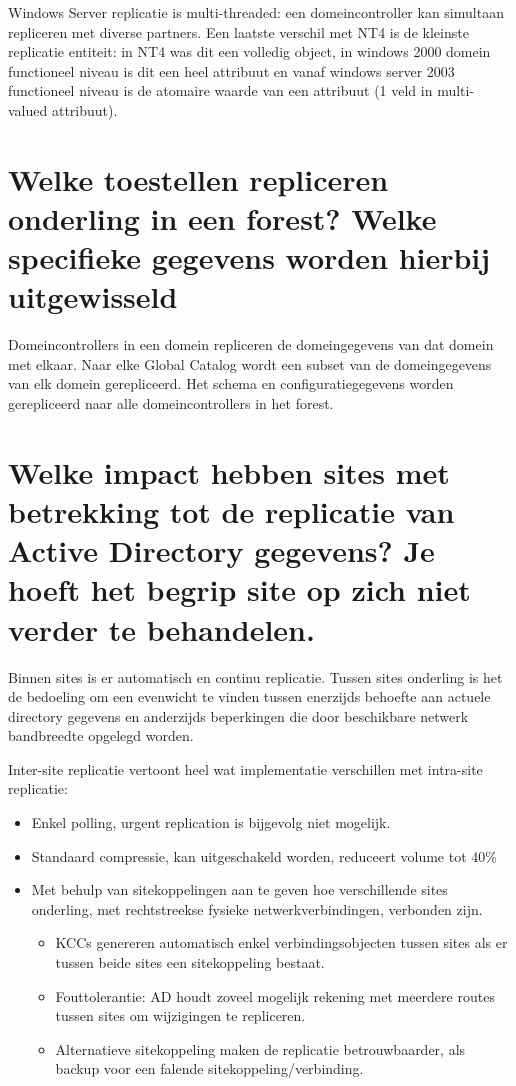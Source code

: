 Windows Server replicatie is multi-threaded: een domeincontroller kan simultaan
repliceren met diverse partners. Een laatste verschil met NT4 is de kleinste
replicatie entiteit: in NT4 was dit een volledig object, in windows 2000
domein functioneel niveau is dit een heel attribuut en vanaf windows server 2003
functioneel niveau is de atomaire waarde van een attribuut (1 veld in
multi-valued attribuut).

\section{Welke toestellen repliceren onderling in een forest? Welke
specifieke gegevens worden hierbij uitgewisseld}

Domeincontrollers in een domein repliceren de domeingegevens van dat domein met
elkaar. Naar elke Global Catalog wordt een subset van de domeingegevens van elk
domein gerepliceerd. Het schema en configuratiegegevens worden gerepliceerd naar
alle domeincontrollers in het forest.

\section{Welke impact hebben sites met betrekking tot de replicatie van Active
Directory gegevens? Je hoeft het begrip site op zich niet verder te behandelen.}

Binnen sites is er automatisch en continu replicatie. Tussen sites onderling is 
het de bedoeling om een evenwicht te vinden tussen enerzijds behoefte aan 
actuele directory gegevens en anderzijds beperkingen die door beschikbare 
netwerk bandbreedte opgelegd worden.

Inter-site replicatie vertoont heel wat implementatie verschillen met intra-site
replicatie:
\begin{itemize}
	\item Enkel polling, urgent replication is bijgevolg niet mogelijk.
	\item Standaard compressie, kan uitgeschakeld worden, reduceert volume
		tot 40\%
	\item Met behulp van sitekoppelingen aan te geven hoe verschillende
		sites onderling, met rechtstreekse fysieke netwerkverbindingen,
		verbonden zijn.
		\begin{itemize}
			\item KCCs genereren automatisch enkel
				verbindingsobjecten tussen sites als er tussen
				beide sites een sitekoppeling bestaat.
			\item Fouttolerantie: AD houdt zoveel mogelijk rekening
				met meerdere routes tussen sites om wijzigingen
				te repliceren.
			\item Alternatieve sitekoppeling maken de replicatie
				betrouwbaarder, als backup voor een falende
				sitekoppeling/verbinding.
		\end{itemize}
\end{itemize}
